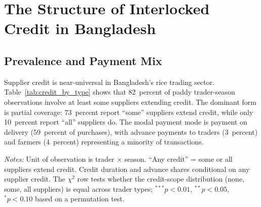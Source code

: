 \documentclass[authoryear,preprint,review,12pt]{elsarticle}
\begin{document}
\section{The Structure of Interlocked Credit in Bangladesh}
\label{sec:descriptive}

\subsection{Prevalence and Payment Mix}

Supplier credit is near-universal in Bangladesh's rice trading sector.
Table~\ref{tab:credit_by_type} shows that 82~percent of paddy trader-season
observations involve at least some suppliers extending credit. The dominant
form is partial coverage: 73~percent report ``some'' suppliers extend credit,
while only 10~percent report ``all'' suppliers do. The modal payment mode is
payment on delivery (59~percent of purchases), with advance payments to
traders (3~percent) and farmers (4~percent) representing a minority of
transactions.

\begin{table}[htbp]
  \centering
  \caption{Credit Arrangement Types by Trader Type (Paddy)}
  \label{tab:credit_by_type}
  \begin{singlespace}
  \begin{threeparttable}
    {\setlength{\tabcolsep}{4pt}}
    \begin{tablenotes}\footnotesize
      \item \textit{Notes:} Unit of observation is trader $\times$ season.
      ``Any credit'' = some or all suppliers extend credit.
      Credit duration and advance shares conditional on any supplier credit.
      The $\chi^2$ row tests whether the credit-scope distribution (none,
      some, all suppliers) is equal across trader types; $^{***}p<0.01$,
      $^{**}p<0.05$, $^{*}p<0.10$ based on a permutation test.
    \end{tablenotes}
  \end{threeparttable}
  \end{singlespace}
\end{table}
\end{document}
